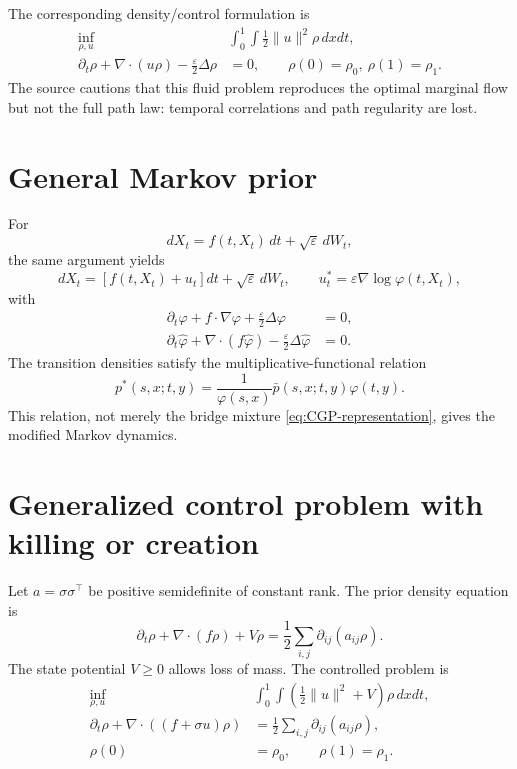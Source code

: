 The corresponding density/control formulation is
\begin{align}
 \inf_{\rho,u}&\int_0^1\int\frac12\|u\|^2\rho\,dxdt,
 \label{eq:CGP-fluid-cost}\\
 \partial_t\rho+\nabla\cdot(u\rho)-\frac\varepsilon2\Delta\rho&=0,
 \qquad \rho(0)=\rho_0,\ \rho(1)=\rho_1. \label{eq:CGP-fluid-fp}
\end{align}
The source cautions that this fluid problem reproduces the optimal marginal flow but not the full
path law: temporal correlations and path regularity are lost.

\section{General Markov prior}
For
\[
 dX_t=f(t,X_t)\,dt+\sqrt\varepsilon\,dW_t,
\]
the same argument yields
\[
 dX_t=[f(t,X_t)+u_t]dt+\sqrt\varepsilon\,dW_t,
 \qquad
 u_t^*=\varepsilon\nabla\log\varphi(t,X_t),
\]
with
\begin{align*}
 \partial_t\varphi+f\cdot\nabla\varphi+\frac\varepsilon2\Delta\varphi&=0,\\
 \partial_t\widehat\varphi+\nabla\cdot(f\widehat\varphi)
 -\frac\varepsilon2\Delta\widehat\varphi&=0.
\end{align*}
The transition densities satisfy the multiplicative-functional relation
\begin{equation}
 p^*(s,x;t,y)
 =\frac{1}{\varphi(s,x)}\bar p(s,x;t,y)\varphi(t,y).
 \label{eq:CGP-multiplicative}
\end{equation}
This relation, not merely the bridge mixture \eqref{eq:CGP-representation}, gives the modified
Markov dynamics.

\section{Generalized control problem with killing or creation}
Let $a=\sigma\sigma^\top$ be positive semidefinite of constant rank.  The prior density equation is
\begin{equation}
 \partial_t\rho+\nabla\cdot(f\rho)+V\rho
 =\frac12\sum_{i,j}\partial_{ij}(a_{ij}\rho).
 \label{eq:CGP-prior-fp}
\end{equation}
The state potential $V\ge0$ allows loss of mass.  The controlled problem is
\begin{align}
 \inf_{\rho,u}&\int_0^1\int
 \left(\frac12\|u\|^2+V\right)\rho\,dxdt,
 \label{eq:CGP-FD-cost}\\
 \partial_t\rho+\nabla\cdot((f+\sigma u)\rho)
 &=\frac12\sum_{i,j}\partial_{ij}(a_{ij}\rho),
 \label{eq:CGP-FD-constraint}\\
 \rho(0)&=\rho_0,\qquad \rho(1)=\rho_1.
\end{align}

